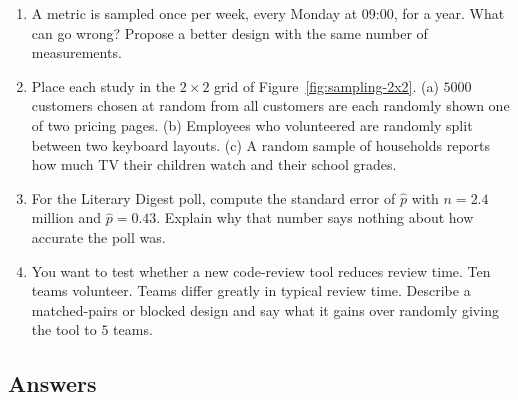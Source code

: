 \begin{enumerate}
  \item A metric is sampled once per week, every Monday at 09:00, for a year. What can
  go wrong? Propose a better design with the same number of measurements.

  \item Place each study in the $2\times 2$ grid of
  Figure~\ref{fig:sampling-2x2}. (a) $5000$ customers chosen at random from all
  customers are each randomly shown one of two pricing pages. (b) Employees who
  volunteered are randomly split between two keyboard layouts. (c) A random sample of
  households reports how much TV their children watch and their school grades.

  \item For the Literary Digest poll, compute the standard error of $\hat p$ with
  $n = 2.4$ million and $\hat p = 0.43$. Explain why that number says nothing about how
  accurate the poll was.

  \item You want to test whether a new code-review tool reduces review time. Ten teams
  volunteer. Teams differ greatly in typical review time. Describe a matched-pairs or
  blocked design and say what it gains over randomly giving the tool to $5$ teams.
\end{enumerate}

\subsection*{Answers}

